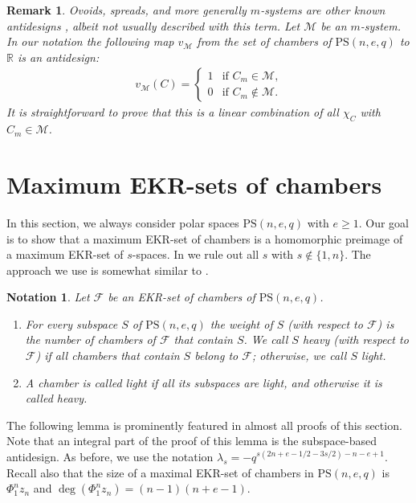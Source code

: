 \documentclass[11pt]{article}
\newtheorem{notation}[thm]{Notation}
\newtheorem{remark}[thm]{Remark}
\newcommand{\EKR}{\mathcal{F}}
\newcommand{\PS}{\mathrm{PS}}
\renewcommand{\ge}{\geqslant}
\begin{document}
\begin{remark}
Ovoids, spreads, and more generally $m$-systems \cite{m-systems} are other known antidesigns \cite[Theorem 4.4.14]{Vanhove_PhD}, albeit not usually described with this term.
Let $\mathcal{M}$ be an $m$-system.
In our notation the following map $v_\mathcal{M}$ from the set of chambers of $\PS(n,e,q)$ to $\mathbb{R}$ is an antidesign:
\begin{align*}
v_\mathcal{M}(C)=\left\{\begin{array}{ll}
1 & \text{if $C_m\in \mathcal{M}$,}
\\
0 &  \text{if $C_m\notin \mathcal{M}$.}
\end{array}
\right.
\end{align*}
It is straightforward to prove that this is a linear combination of all $\chi_C$ with $C_m\in \mathcal{M}$.
\end{remark}

 
 \section{Maximum EKR-sets of chambers} \label{Section: Classification of ekr}


In this section, we always consider polar spaces $\PS(n,e,q)$ with $e\ge 1$. Our goal is to show that a maximum EKR-set of chambers is a homomorphic preimage of a maximum EKR-set of $s$-spaces. In  we rule out all $s$ with $s\notin \{1,n\}$. The approach we use is somewhat similar to \cite{klaus_jesse_philipp}.

\begin{notation} Let $\EKR$ be an EKR-set of chambers of $\PS(n,e,q)$.
\begin{enumerate}[1.]
\item 
For every subspace $S$ of $\PS(n,e,q)$ the weight of $S$ (with respect to $\EKR$) is the number of chambers of $\EKR$ that contain $S$. We call $S$ \emph{heavy} (with respect to $\EKR$) if all chambers that contain $S$ belong to $\EKR$; otherwise, we call $S$ \emph{light}.
\item A chamber is called \emph{light} if all its subspaces are light, and otherwise it is called \emph{heavy}.
\end{enumerate}
\end{notation}



The following lemma is prominently featured in almost all proofs of this section. Note that an integral part of the proof of this lemma is the subspace-based antidesign. As before, we use the notation $\lambda_s=-q^{s(2n+e-1/2-3s/2)-n-e+1}$. Recall also that the size of a maximal EKR-set of chambers in $\PS(n,e,q)$ is $\Phi_1^n z_n$ and $\deg(\Phi_1^nz_n)=(n-1)(n+e-1)$.
\end{document}
